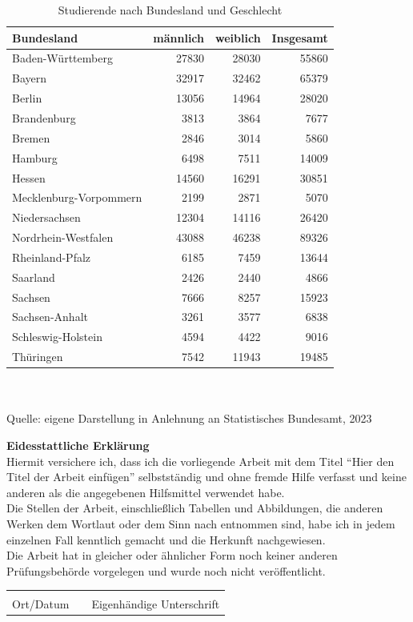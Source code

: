 \documentclass[11pt,oneside]{article}
\newcommand{\titelderarbeit}{Hier den Titel der Arbeit einfügen}
\begin{document}
	\begin{table}[H]
	   	\caption{Studierende nach Bundesland und Geschlecht}
		\begin{tabular}{|l|r|r|r|}
			\toprule
			\textbf{Bundesland} & \textbf{männlich} & \textbf{weiblich} & \textbf{Insgesamt} \\
			\midrule
			Baden-Württemberg & 27830 & 28030 & 55860 \\
			Bayern & 32917 & 32462 & 65379 \\
			Berlin & 13056 & 14964 & 28020 \\
			Brandenburg & 3813 & 3864 & 7677 \\
			Bremen & 2846 & 3014 & 5860 \\
			Hamburg & 6498 & 7511 & 14009 \\
			Hessen & 14560 & 16291 & 30851 \\
			Mecklenburg-Vorpommern & 2199 & 2871 & 5070 \\
			Niedersachsen & 12304 & 14116 & 26420 \\
			Nordrhein-Westfalen & 43088 & 46238 & 89326 \\
			Rheinland-Pfalz & 6185 & 7459 & 13644 \\
			Saarland & 2426 & 2440 & 4866 \\
			Sachsen & 7666 & 8257 & 15923 \\
			Sachsen-Anhalt & 3261 & 3577 & 6838 \\
			Schleswig-Holstein & 4594 & 4422 & 9016 \\
			Thüringen & 7542 & 11943 & 19485 \\
			\bottomrule
		\end{tabular}
		\footnotesize \\\\ Quelle: eigene Darstellung in Anlehnung an Statistisches Bundesamt, 2023
		\label{tab:studis}
	\end{table}

	\clearpage
	\printbibliography[heading=bibintoc]
	
	\clearpage
	\textbf{Eidesstattliche Erklärung}\\
	
	Hiermit versichere ich, dass ich die vorliegende Arbeit mit dem Titel ``\titelderarbeit''
	selbstständig und ohne fremde Hilfe verfasst und keine anderen als die angegebenen Hilfsmittel
	verwendet habe.\\
	
	Die Stellen der Arbeit, einschließlich Tabellen und Abbildungen, die anderen Werken dem Wortlaut
	oder dem Sinn nach entnommen sind, habe ich in jedem einzelnen Fall kenntlich gemacht und die
	Herkunft nachgewiesen.\\

	Die Arbeit hat in gleicher oder ähnlicher Form noch keiner anderen Prüfungsbehörde vorgelegen und
	wurde noch nicht veröffentlicht.\\
	
	
	\vspace{1.5cm}
	\begin{tabular}{@{}p{4cm}p{1cm}p{8cm}@{}}
		\hrulefill	& & \hrulefill \\
		Ort/Datum	& & Eigenhändige Unterschrift \\
	\end{tabular}
	
\end{document}
